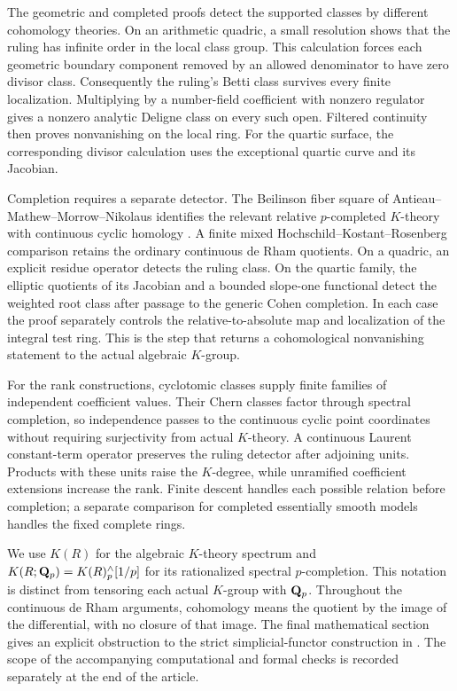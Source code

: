 The geometric and completed proofs detect the supported classes by
different cohomology theories. On an arithmetic quadric, a small
resolution shows that the ruling has infinite order in the local
class group. This calculation forces each geometric boundary component
removed by an allowed denominator to have zero divisor class.
Consequently the ruling's Betti class survives every finite
localization. Multiplying by a number-field coefficient with nonzero
regulator gives a nonzero analytic Deligne class on every such open.
Filtered continuity then proves nonvanishing on the local ring.
For the quartic surface, the corresponding divisor calculation uses
the exceptional quartic curve and its Jacobian.

Completion requires a separate detector. The Beilinson fiber square
of Antieau--Mathew--Morrow--Nikolaus identifies the relevant relative
$p$-completed $K$-theory with continuous cyclic homology
\cite{AMMN}. A finite mixed Hochschild--Kostant--Rosenberg comparison
retains the ordinary continuous de Rham quotients. On a quadric, an
explicit residue operator detects the ruling class. On the quartic
family, the elliptic quotients of its Jacobian and a bounded
slope-one functional detect the weighted root class after passage to
the generic Cohen completion. In each case the proof separately
controls the relative-to-absolute map and localization of the
integral test ring. This is the step that returns a cohomological
nonvanishing statement to the actual algebraic $K$-group.

For the rank constructions, cyclotomic classes supply finite families
of independent coefficient values. Their Chern classes factor through
spectral completion, so independence passes to the continuous cyclic
point coordinates without requiring surjectivity from actual
$K$-theory. A continuous Laurent constant-term operator preserves the
ruling detector after adjoining units. Products with these units raise
the $K$-degree, while unramified coefficient extensions increase the
rank. Finite descent handles each possible relation before completion;
a separate comparison for completed essentially smooth models handles
the fixed complete rings.

We use $K(R)$ for the algebraic $K$-theory spectrum and
$K(R;\mathbf Q_p)=K(R)^{\wedge}_p[1/p]$ for its rationalized spectral
$p$-completion. This notation is distinct from tensoring each actual
$K$-group with $\mathbf Q_p$. Throughout the continuous de Rham arguments,
cohomology means the quotient by the image of the differential, with
no closure of that image.
The final mathematical section gives an explicit obstruction to the
strict simplicial-functor construction in
\cite[Lemma~13(III)]{MochizukiParameters}.
The scope of the accompanying computational and formal checks is
recorded separately at the end of the article.
